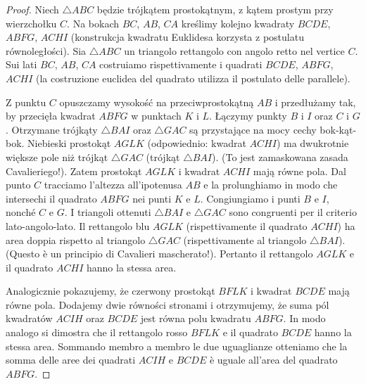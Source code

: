 \begin{proof}
    Niech $\triangle ABC$ będzie trójkątem prostokątnym, z kątem prostym przy wierzchołku $C$. %
    Na bokach $BC$, $AB$, $CA$ kreślimy kolejno kwadraty $BCDE$, $ABFG$, $ACHI$ (konstrukcja kwadratu Euklidesa korzysta z postulatu równoległości). %
    Sia $\triangle ABC$ un triangolo rettangolo con angolo retto nel vertice $C$. %
    Sui lati $BC$, $AB$, $CA$ costruiamo rispettivamente i quadrati $BCDE$, $ABFG$, $ACHI$ (la costruzione euclidea del quadrato utilizza il postulato delle parallele). %

    \begin{center}

    \end{center}

    Z punktu $C$ opuszczamy wysokość na przeciwprostokątną $AB$ i przedłużamy tak, by przecięła kwadrat $ABFG$ w punktach $K$ i $L$. %
    Łączymy punkty $B$ i $I$ oraz $C$ i $G$. %
    Otrzymane trójkąty $\triangle BAI$ oraz $\triangle GAC$ są przystające na mocy cechy bok-kąt-bok. %
    Niebieski prostokąt $AGLK$ (odpowiednio: kwadrat $ACHI$) ma dwukrotnie większe pole niż trójkąt $\triangle GAC$ (trójkąt $\triangle BAI$). %
    (To jest zamaskowana zasada Cavalieriego!). %
    Zatem prostokąt $AGLK$ i kwadrat $ACHI$ mają równe pola. %
    Dal punto $C$ tracciamo l'altezza all'ipotenusa $AB$ e la prolunghiamo in modo che intersechi il quadrato $ABFG$ nei punti $K$ e $L$. %
    Congiungiamo i punti $B$ e $I$, nonché $C$ e $G$. %
    I triangoli ottenuti $\triangle BAI$ e $\triangle GAC$ sono congruenti per il criterio lato-angolo-lato. %
    Il rettangolo blu $AGLK$ (rispettivamente il quadrato $ACHI$) ha area doppia rispetto al triangolo $\triangle GAC$ (rispettivamente al triangolo $\triangle BAI$). %
    (Questo è un principio di Cavalieri mascherato!). %
    Pertanto il rettangolo $AGLK$ e il quadrato $ACHI$ hanno la stessa area. %

    Analogicznie pokazujemy, że czerwony prostokąt $BFLK$ i kwadrat $BCDE$ mają równe pola. %
    Dodajemy dwie równości stronami i otrzymujemy, że suma pól kwadratów $ACIH$ oraz $BCDE$ jest równa polu kwadratu $ABFG$. %
    In modo analogo si dimostra che il rettangolo rosso $BFLK$ e il quadrato $BCDE$ hanno la stessa area. %
    Sommando membro a membro le due uguaglianze otteniamo che la somma delle aree dei quadrati $ACIH$ e $BCDE$ è uguale all'area del quadrato $ABFG$. %
\end{proof}

